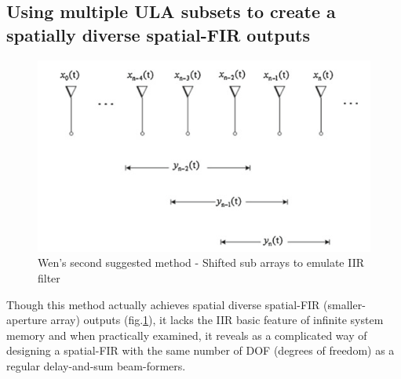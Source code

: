 \documentclass[12pt]{article}
\begin{document}
\subsection*{Using multiple ULA subsets to create a spatially diverse spatial-FIR outputs}
\begin{figure}
\begin{center}
\includegraphics[width=.4\textwidth]{Media/SpatialIIR_SubArrays.PNG}
\caption{Wen's second suggested method - Shifted sub arrays to emulate IIR filter}
\label{fig:ShiftedSubArraysWen}
\end{center}
\end{figure}
Though this method actually achieves spatial diverse spatial-FIR (smaller-aperture array) outputs (fig.\ref{fig:ShiftedSubArraysWen}), it lacks the IIR basic feature of infinite system memory and when practically examined, it reveals as a complicated way of designing a spatial-FIR with the same number of DOF (degrees of freedom) as a regular delay-and-sum beam-formers.
\end{document}
